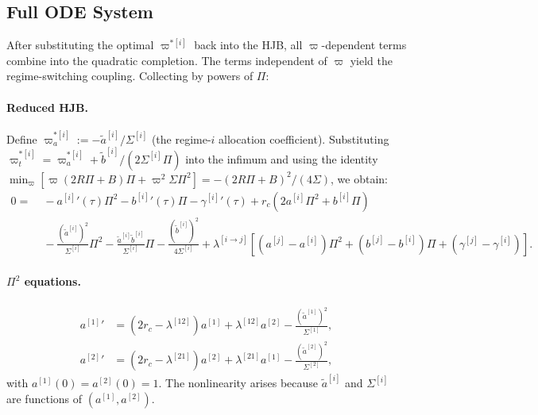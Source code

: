 \documentclass[11pt,a4paper]{article}
\numberwithin{equation}{section}
\begin{document}
\begin{appendices}
\subsection{Full ODE System}\label{app:full_odes}

After substituting the optimal $\varpi^{*[i]}$ back into the HJB, all $\varpi$-dependent terms combine into the quadratic completion. The terms independent of $\varpi$ yield the regime-switching coupling. Collecting by powers of $\Pi$:

\paragraph{Reduced HJB.}\label{app:reduced_hjb} Define $\varpi^{*[i]}_a := -\tilde{a}^{[i]}/\Sigma^{[i]}$ (the regime-$i$ allocation coefficient). Substituting $\varpi^{*[i]}_t = \varpi^{*[i]}_a + \tilde{b}^{[i]}/(2\Sigma^{[i]}\Pi)$ into the infimum and using the identity $\min_\varpi [\varpi(2R\Pi + B)\Pi + \varpi^2 \Sigma\Pi^2] = -(2R\Pi+B)^2/(4\Sigma)$, we obtain:
\begin{equation}\label{eq:reduced_hjb_full}
\begin{split}
0 = &\;-{a^{[i]}}'(\tau)\Pi^2 - {b^{[i]}}'(\tau)\Pi - {\gamma^{[i]}}'(\tau) + r_c(2a^{[i]}\Pi^2 + b^{[i]}\Pi) \\
&\;- \frac{(\tilde{a}^{[i]})^2}{\Sigma^{[i]}}\Pi^2 - \frac{\tilde{a}^{[i]}\tilde{b}^{[i]}}{\Sigma^{[i]}}\Pi - \frac{(\tilde{b}^{[i]})^2}{4\Sigma^{[i]}} + \lambda^{[i\to j]}\!\left[(a^{[j]} - a^{[i]})\Pi^2 + (b^{[j]}-b^{[i]})\Pi + (\gamma^{[j]}-\gamma^{[i]})\right].
\end{split}
\end{equation}

\paragraph{$\Pi^2$ equations.}\label{app:pi2_eqs}
\begin{align}
{a^{[1]}}' &= (2r_c - \lambda^{[12]})a^{[1]} + \lambda^{[12]} a^{[2]} - \frac{(\tilde{a}^{[1]})^2}{\Sigma^{[1]}}, \label{eq:ode_a1_simple} \\
{a^{[2]}}' &= (2r_c - \lambda^{[21]})a^{[2]} + \lambda^{[21]} a^{[1]} - \frac{(\tilde{a}^{[2]})^2}{\Sigma^{[2]}}, \label{eq:ode_a2_simple}
\end{align}
with $a^{[1]}(0) = a^{[2]}(0) = 1$. The nonlinearity arises because $\tilde{a}^{[i]}$ and $\Sigma^{[i]}$ are functions of $(a^{[1]}, a^{[2]})$.


\end{appendices}
\end{document}
